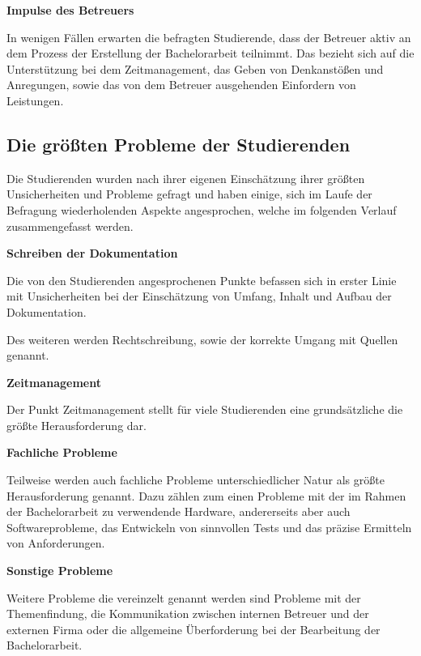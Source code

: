 \documentclass[bibliography=totoc,listof=totoc,BCOR=5mm,DIV=12,oneside]{scrbook}
\begin{document}
\par \medskip \textbf{Impulse des Betreuers}
\par In wenigen Fällen erwarten die befragten Studierende, dass der Betreuer aktiv an dem Prozess der Erstellung der Bachelorarbeit teilnimmt. Das bezieht sich auf die Unterstützung bei dem Zeitmanagement, das Geben von Denkanstößen und Anregungen, sowie das von dem Betreuer ausgehenden Einfordern von Leistungen.

\subsection{Die größten Probleme der Studierenden}
\par Die Studierenden wurden nach ihrer eigenen Einschätzung ihrer größten Unsicherheiten und Probleme gefragt und haben einige, sich im Laufe der Befragung wiederholenden Aspekte angesprochen, welche im folgenden Verlauf zusammengefasst werden.

\par \bigskip \textbf{Schreiben der Dokumentation}
\par Die von den Studierenden angesprochenen Punkte befassen sich in erster Linie mit Unsicherheiten bei der Einschätzung von Umfang, Inhalt und Aufbau der Dokumentation. 
\par Des weiteren werden Rechtschreibung, sowie der korrekte Umgang mit Quellen genannt.

\par \bigskip \textbf{Zeitmanagement}
\par Der Punkt Zeitmanagement stellt für viele Studierenden eine grundsätzliche die größte Herausforderung dar.

\par \bigskip \textbf{Fachliche Probleme}
\par Teilweise werden auch fachliche Probleme unterschiedlicher Natur als größte Herausforderung genannt. Dazu zählen zum einen Probleme mit der im Rahmen der Bachelorarbeit zu verwendende Hardware, andererseits aber auch Softwareprobleme, das Entwickeln von sinnvollen Tests und das präzise Ermitteln von Anforderungen.

\par \bigskip \textbf{Sonstige Probleme}
\par Weitere Probleme die vereinzelt genannt werden sind Probleme mit der Themenfindung, die Kommunikation zwischen internen Betreuer und der externen Firma oder die allgemeine Überforderung bei der Bearbeitung der Bachelorarbeit.
\end{document}
